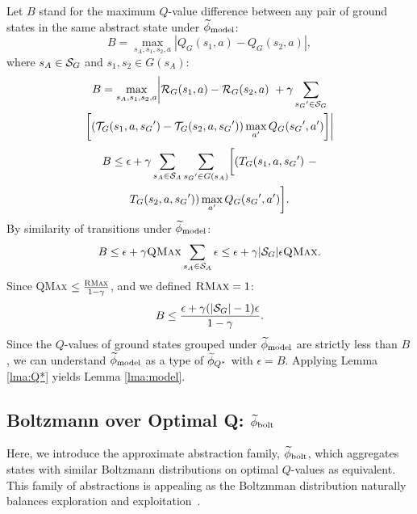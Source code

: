 Let $B$ stand for the maximum $Q$-value difference between any pair of ground states in the same abstract state under $\widetilde \phi_{\text{model}}$:
\begin{equation*}
B = \max_{s_A, s_1, s_2, a}  |Q_G(s_1, a) - Q_G(s_2, a)|,
\end{equation*}
where $s_A \in \mathcal{S}_G$ and $s_1, s_2 \in G(s_A)$:
\begin{multline*}
B=\max_{s_A, s_1, s_2, a}      \biggl|\mathcal{R}_G(s_1, a) - \mathcal{R}_G(s_2, a)\ + \gamma \sum_{{s_G}' \in \mathcal{S}_G} \\
\biggl[(\mathcal{T}_G(s_1,a,{s_G}') -\mathcal{T}_G(s_2, a, {s_G}'))\max_{a'}Q_G({s_G}', a')\biggr]\biggr|
\end{multline*}
\begin{multline*}
B\leq \epsilon + \gamma \sum_{s_A \in \mathcal{S}_A}\sum_{{s_G}' \in G(s_A)} \biggl[(T_G(s_1, a, {s_G}')\ -\\ 
T_G(s_2, a, {s_G}')) \max_{a'}Q_G({s_G}', a') \biggr].
\end{multline*}
By similarity of transitions under $\widetilde \phi_{\text{model}}$:
\begin{align*}
B \leq \epsilon + \gamma \textsc{QMax} \sum_{s_A \in \mathcal{S}_A} \epsilon \leq \epsilon + \gamma|\mathcal{S}_G|\epsilon \textsc{QMax}.
\end{align*}
Since \textsc{QMax} $\leq \frac{\textsc{RMax}}{1-\gamma}$, and we defined $\textsc{RMax} = 1$:
\begin{equation*}
B \leq \frac{\epsilon + \gamma(|\mathcal{S}_G| - 1) \epsilon}{1-\gamma}.
\end{equation*}
Since the $Q$-values of ground states grouped under $\widetilde \phi_{\text{model}}$ are strictly less than $B$, we can understand $\widetilde \phi_{\text{model}}$ as a type of $\widetilde \phi_{Q^*}$ with $\epsilon = B$. Applying Lemma \ref{lma:Q*} yields Lemma \ref{lma:model}.
\subsection{Boltzmann over Optimal Q: $\widetilde \phi_{\text{bolt}}$}
\label{sec:boltz}

Here, we introduce the approximate abstraction family, $\widetilde \phi_{\text{bolt}}$, which aggregates states with similar Boltzmann distributions on optimal $Q$-values as equivalent. This family of abstractions is appealing as the Boltzmman distribution naturally balances exploration and exploitation~\cite{sutton1998reinforcement}.

